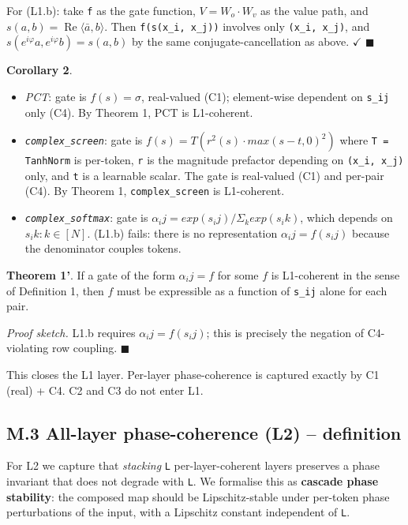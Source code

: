 \documentclass[11pt,a4paper]{article}
\theoremstyle{plain}
\theoremstyle{definition}
\renewcommand{\Re}{\operatorname{Re}}
\begin{document}
For (L1.b): take \texttt{f} as the gate function, $V = W_o \cdot  W_v$ as the value path, and $s(a, b) = \Re \langle \bar{a}, b\rangle $. Then \texttt{f(s(x\_i, x\_j))} involves only \texttt{(x\_i, x\_j)}, and $s(e^{i\varphi } a, e^{i\varphi } b) = s(a, b)$ by the same conjugate-cancellation as above. $\checkmark$ $\blacksquare$

\textbf{Corollary 2}.

\begin{itemize}
  \item \emph{PCT}: gate is $f(s) = \sigma $, real-valued (C1); element-wise dependent on \texttt{s\_ij} only (C4). By Theorem 1, PCT is L1-coherent.
  \item \emph{\texttt{complex\_screen}}: gate is $f(s) = T(r^2(s) \cdot  max(s - t, 0)^2)$ where \texttt{T = TanhNorm} is per-token, \texttt{r} is the magnitude prefactor depending on \texttt{(x\_i, x\_j)} only, and \texttt{t} is a learnable scalar. The gate is real-valued (C1) and per-pair (C4). By Theorem 1, \texttt{complex\_screen} is L1-coherent.
  \item \emph{\texttt{complex\_softmax}}: gate is $\alpha _ij = exp(s_ij) / \Sigma _k exp(s_ik)$, which depends on ${s_ik : k \in  [N]}$. (L1.b) fails: there is no representation $\alpha _ij = f(s_ij)$ because the denominator couples tokens.
\end{itemize}

\textbf{Theorem 1'}. If a gate of the form $\alpha _ij = f$ for some $f$ is L1-coherent in the sense of Definition 1, then $f$ must be expressible as a function of \texttt{s\_ij} alone for each pair.

\emph{Proof sketch.} L1.b requires $\alpha _ij = f(s_ij)$; this is precisely the negation of C4-violating row coupling. $\blacksquare$

This closes the L1 layer. Per-layer phase-coherence is captured exactly by C1 (real) + C4. C2 and C3 do not enter L1.

\subsection{M.3 All-layer phase-coherence (L2) -- definition}
For L2 we capture that \emph{stacking} \texttt{L} per-layer-coherent layers preserves a phase invariant that does not degrade with \texttt{L}. We formalise this as \textbf{cascade phase stability}: the composed map should be Lipschitz-stable under per-token phase perturbations of the input, with a Lipschitz constant independent of \texttt{L}.
\end{document}
